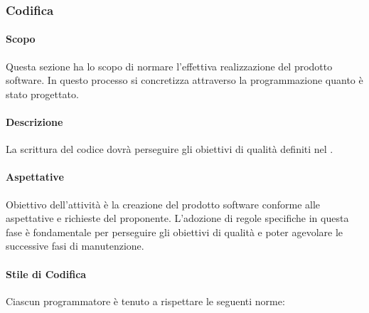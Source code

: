 \subsubsection{Codifica}
\paragraph{Scopo}
Questa sezione ha lo scopo di normare l'effettiva realizzazione del prodotto software.  In questo processo si concretizza attraverso la programmazione quanto è stato progettato.

\paragraph{Descrizione}
La scrittura del codice dovrà perseguire gli obiettivi di qualità definiti nel .

\paragraph{Aspettative}
Obiettivo dell'attività è la creazione del prodotto software conforme alle aspettative e richieste del proponente.  L'adozione di regole specifiche in questa fase è fondamentale per perseguire gli obiettivi di qualità e poter agevolare le successive fasi di manutenzione.

\paragraph{Stile di Codifica}
Ciascun programmatore è tenuto a rispettare le seguenti norme:

